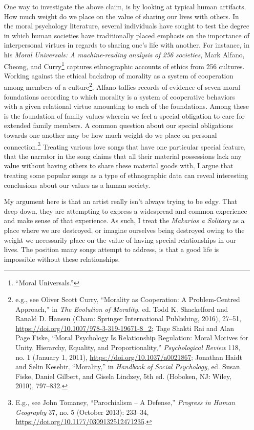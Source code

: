 \documentclass[phdthesis,12pt,final]{wuthesis}
\theoremstyle{definition}
\theoremstyle{definition}
\theoremstyle{definition}
\theoremstyle{definition}
\theoremstyle{remark}
\begin{document}
One way to investigate the above claim, is by looking at typical human artifacts. How much weight do we place on the value of sharing our lives with others. In the moral psychology literature, several individuals have sought to test the degree in which human societies have traditionally placed emphasis on the importance of interpersonal virtues in regards to sharing one's life with another. For instance, in his \emph{Moral Universals: A machine-reading analysis of 256 societies}, Mark Alfano, Cheong, and Curry\footnote{{``Moral {Universals}.''}} captures ethnographic accounts of ethics from 256 cultures. Working against the ethical backdrop of morality as a system of cooperation among members of a culture\footnote{e.g., see Oliver Scott Curry, {``Morality as {Cooperation}: {A Problem-Centred Approach},''} in \emph{The {Evolution} of {Morality}}, ed. Todd K. Shackelford and Ranald D. Hansen (Cham: Springer International Publishing, 2016), 27--51, \url{https://doi.org/10.1007/978-3-319-19671-8_2}; Tage Shakti Rai and Alan Page Fiske, {``Moral Psychology Is Relationship Regulation: Moral Motives for Unity, Hierarchy, Equality, and Proportionality,''} \emph{Psychological Review} 118, no. 1 (January 1, 2011), \url{https://doi.org/10.1037/a0021867}; Jonathan Haidt and Selin Kesebir, {``Morality,''} in \emph{Handbook of Social Psychology}, ed. Susan Fiske, Daniel Gilbert, and Gisela Lindzey, 5th ed. (Hoboken, NJ: Wiley, 2010), 797--832.}, Alfano tallies records of evidence of seven moral foundations according to which morality is a system of cooperative behaviors with a given relational virtue amounting to each of the foundations. Among these is the foundation of family values wherein we feel a special obligation to care for extended family members. A common question about our special obligations towards one another may be how much weight do we place on personal connection.\footnote{E.g., see John Tomaney, {``Parochialism -- {A Defense},''} \emph{Progress in Human Geography} 37, no. 5 (October 2013): 233--34, \url{https://doi.org/10.1177/0309132512471235}.} Treating various love songs that have one particular special feature, that the narrator in the song claims that all their material possessions lack any value without having others to share these material goods with, I argue that treating some popular songs as a type of ethnographic data can reveal interesting conclusions about our values as a human society.

My argument here is that an artist really isn't always trying to be edgy. That deep down, they are attempting to express a widespread and common experience and make sense of that experience. As such, I treat the \emph{Makarios a Solitary} as a place where we are destroyed, or imagine ourselves being destroyed owing to the weight we necessarily place on the value of having special relationships in our lives. The position many songs attempt to address, is that a good life is impossible without these relationships.
\end{document}
